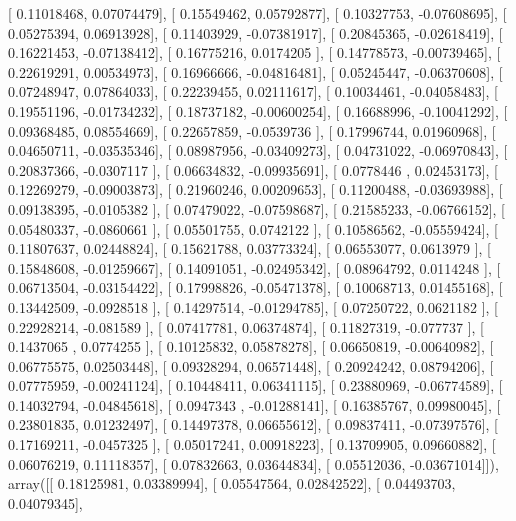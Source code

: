 \documentclass{article}
\begin{document}
       [ 0.11018468,  0.07074479],
       [ 0.15549462,  0.05792877],
       [ 0.10327753, -0.07608695],
       [ 0.05275394,  0.06913928],
       [ 0.11403929, -0.07381917],
       [ 0.20845365, -0.02618419],
       [ 0.16221453, -0.07138412],
       [ 0.16775216,  0.0174205 ],
       [ 0.14778573, -0.00739465],
       [ 0.22619291,  0.00534973],
       [ 0.16966666, -0.04816481],
       [ 0.05245447, -0.06370608],
       [ 0.07248947,  0.07864033],
       [ 0.22239455,  0.02111617],
       [ 0.10034461, -0.04058483],
       [ 0.19551196, -0.01734232],
       [ 0.18737182, -0.00600254],
       [ 0.16688996, -0.10041292],
       [ 0.09368485,  0.08554669],
       [ 0.22657859, -0.0539736 ],
       [ 0.17996744,  0.01960968],
       [ 0.04650711, -0.03535346],
       [ 0.08987956, -0.03409273],
       [ 0.04731022, -0.06970843],
       [ 0.20837366, -0.0307117 ],
       [ 0.06634832, -0.09935691],
       [ 0.0778446 ,  0.02453173],
       [ 0.12269279, -0.09003873],
       [ 0.21960246,  0.00209653],
       [ 0.11200488, -0.03693988],
       [ 0.09138395, -0.0105382 ],
       [ 0.07479022, -0.07598687],
       [ 0.21585233, -0.06766152],
       [ 0.05480337, -0.0860661 ],
       [ 0.05501755,  0.0742122 ],
       [ 0.10586562, -0.05559424],
       [ 0.11807637,  0.02448824],
       [ 0.15621788,  0.03773324],
       [ 0.06553077,  0.0613979 ],
       [ 0.15848608, -0.01259667],
       [ 0.14091051, -0.02495342],
       [ 0.08964792,  0.0114248 ],
       [ 0.06713504, -0.03154422],
       [ 0.17998826, -0.05471378],
       [ 0.10068713,  0.01455168],
       [ 0.13442509, -0.0928518 ],
       [ 0.14297514, -0.01294785],
       [ 0.07250722,  0.0621182 ],
       [ 0.22928214, -0.081589  ],
       [ 0.07417781,  0.06374874],
       [ 0.11827319, -0.077737  ],
       [ 0.1437065 ,  0.0774255 ],
       [ 0.10125832,  0.05878278],
       [ 0.06650819, -0.00640982],
       [ 0.06775575,  0.02503448],
       [ 0.09328294,  0.06571448],
       [ 0.20924242,  0.08794206],
       [ 0.07775959, -0.00241124],
       [ 0.10448411,  0.06341115],
       [ 0.23880969, -0.06774589],
       [ 0.14032794, -0.04845618],
       [ 0.0947343 , -0.01288141],
       [ 0.16385767,  0.09980045],
       [ 0.23801835,  0.01232497],
       [ 0.14497378,  0.06655612],
       [ 0.09837411, -0.07397576],
       [ 0.17169211, -0.0457325 ],
       [ 0.05017241,  0.00918223],
       [ 0.13709905,  0.09660882],
       [ 0.06076219,  0.11118357],
       [ 0.07832663,  0.03644834],
       [ 0.05512036, -0.03671014]]), array([[ 0.18125981,  0.03389994],
       [ 0.05547564,  0.02842522],
       [ 0.04493703,  0.04079345],
\end{document}
